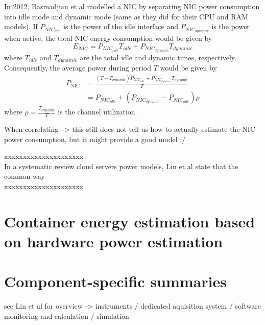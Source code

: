 In 2012, Basmadjian et al\parencite{basmadjianCloudComputingIts2012} modelled a NIC by separating NIC power consumption into idle mode and dynamic mode (same as they did for their CPU and RAM models). If $P_{NIC_{idle}}$ is the power of the idle interface and $P_{NIC_{dynamic}}$ is the power when active, the total NIC energy consumption would be given by
\begin{equation}
    E_{NIC} = P_{NIC_{idle}}T_{idle} + P_{NIC_{dynamic}}T_{dynamic}
\end{equation}
where $T_{idle}$ and $T_{dynamic}$ are the total idle and dynamic times, respectively. Consequently, the average power during period $T$ would be given by
\begin{align}
    P_{\text{NIC}} &= \frac{(T - T_{\text{dynamic}}) P_{NIC_{idle}} + P_{NIC_{dynamic}} T_{\text{dynamic}}}{T}\\
                   &= P_{NIC_{idle}} + (P_{NIC_{dynamic}} - P_{NIC_{idle}})\rho
\end{align}
where $\rho=\frac{T_{\text{dynamic}}}{T}$ is the channel utilization.

When correlating --> this still does not tell us how to actually estimate the NIC power consumption, but it might provide a good model :/



\parencite{arjonaarocaMeasurementbasedAnalysisEnergy2014} %








xxxxxxxxxxxxxxxxxxxxx\\
In a systematic review cloud servers power models, Lin et al\parencite{lin2020taxonomy} state that the common way\\
xxxxxxxxxxxxxxxxxxxxx\\






\section{Container energy estimation based on hardware power estimation}


\section{Component-specific summaries}
\label{sec:component_specific_summaries}

see Lin et al for overview -> instruments / dedicated aquisition system / software monitoring and calculation / simulation

